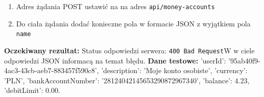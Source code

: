 \begin{enumerate}[labelwidth=1em,label=\Roman*]
\begin{enumerate}[label=\arabic*.]
        \item Adres żądania POST ustawić na na adres \texttt{api/money-accounts}
        \item Do ciała żądania dodać konieczne pola w formacie JSON z wyjątkiem pola \texttt{name}
    \end{enumerate}
    \textbf{Oczekiwany rezultat:}  Status odpowiedzi serwera: \texttt{400 Bad Request}W w ciele odpowiedzi JSON informacą na temat błędu. \newline
    \textbf{Dane testowe:} 'userId': '95ab40f9-4ac3-43cb-aeb7-883457f590c8', 'description': 'Moje konto osobiste', 'currency': 'PLN', 'bankAccountNumber': '28124042145653290872967340', 'balance': 4.23, 'debitLimit': 0.00.
\end{enumerate}

